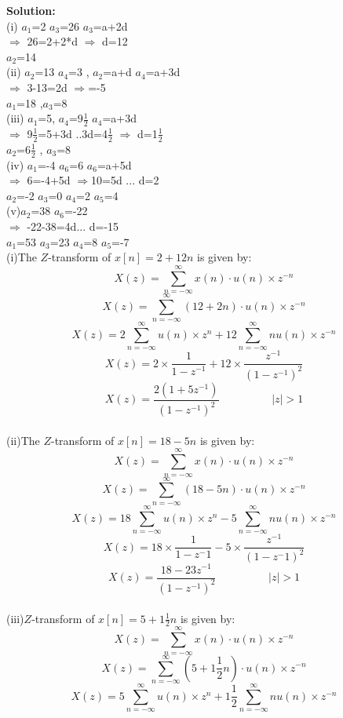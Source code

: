 \documentclass[journal,12pt,twocolumn]{IEEEtran}
\theoremstyle{remark}
\begin{document}
\textbf{Solution:}\\

(i) $a_1$=2 $a_3$=26 $a_3$=a+2d\\
$\Longrightarrow$ 26=2+2*d $\Longrightarrow$ d=12\\
$a_2$=14\\
(ii) $a_2$=13 $a_4$=3 , $a_2$=a+d $a_4$=a+3d \\
$\Longrightarrow$ 3-13=2d $\Longrightarrow$=-5\\ $a_1$=18 ,$a_3$=8\\
(iii) $a_1$=5, $a_4$=9\(\frac{1}{2}\) $a_4$=a+3d\\
$\Longrightarrow$ 9\(\frac{1}{2}\)=5+3d ..3d=4\(\frac{1}{2}\) $\Longrightarrow$ d=1\(\frac{1}{2}\)\\
$a_2$=6\(\frac{1}{2}\) , $a_3$=8\\
(iv) $a_1$=-4 $a_6$=6 $a_6$=a+5d\\
$\Longrightarrow$ 6=-4+5d $\Longrightarrow$10=5d ... d=2\\
$a_2$=-2 $a_3$=0 $a_4$=2 $a_5$=4\\
(v)$a_2$=38 $a_6$=-22 \\
$\Longrightarrow$ -22-38=4d... d=-15\\
$a_1$=53 $a_3$=23 $a_4$=8 $a_5$=-7\\
(i)The $Z$-transform of $x[n] = 2 + 12n$ is given by:
\[X(z)= \sum_{n=-\infty}^{\infty} x(n)\cdot u(n) \times z^{-n}\]
\[ X(z) = \sum_{n=-\infty}^{\infty} (12+2n)\cdot u(n) \times z^{-n} \]
\[X(z)=2 \sum_{n=-\infty}^{\infty}u(n)\times z^{n}+12 \sum_{n=-\infty}^{\infty}nu(n)\times z^{-n}\]
\[X(z)=2 \times \frac{1}{1-{z^{-1}}}+ 12 \times \frac{z^{-1}}{(1-{z^{-1}})^2}\]
\[X(z)=\frac{2(1+{5z^{-1}})}{(1-{z^{-1}})^2}  \hspace{2cm}  |z|>1 \]\\
(ii)The $Z$-transform of $x[n] = 18 - 5n$ is given by:
\[ X(z) = \sum_{n=-\infty}^{\infty} x(n)\cdot u(n)\times z^{-n} \]
\[ X(z) = \sum_{n=-\infty}^{\infty} (18-5n)\cdot u(n) \times z^{-n} \]
\[X(z)=18 \sum_{n=-\infty}^{\infty}u(n)\times z^{n} - 5\sum_{n=-\infty}^{\infty} nu(n)\times z^{-n}\]
\[X(z)=18 \times \frac{1}{1-{z^-1}} - 5 \times \frac{z^{-1}}{(1-{z^-1})^2}\]
\[X(z)=\frac{18-{23z^{-1}}}{(1-{z^{-1}})^2}  \hspace{2cm}  |z|>1 \]\\
(iii)$Z$-transform of $x[n] = 5 + 1\frac{1}{2}n$ is given by:
\[ X(z) = \sum_{n=-\infty}^{\infty} x(n)\cdot u(n)\times z^{-n} \]
\[ X(z) = \sum_{n=-\infty}^{\infty} (5+1\frac{1}{2}n) \cdot u(n) \times z^{-n} \]
\[X(z)=5 \sum_{n=-\infty}^{\infty}u(n)\times z^{n}+1\frac{1}{2} \sum_{n=-\infty}^{\infty} nu(n) \times z^{-n}\]
\end{document}
